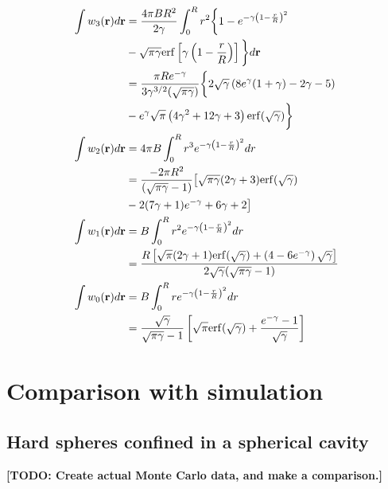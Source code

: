 \documentclass[letterpaper,twocolumn,amsmath,amssymb,prb]{revtex4-1}
\newcommand{\red}[1]{{\bf \color{red} #1}}
\newcommand{\rr}{\textbf{r}}
\newcommand{\fixme}[1]{\red{[#1]}}
\begin{document}
\begin{align}
  \int w_3(\rr)d\rr &= \frac{4\pi BR^2}{2\gamma}\int_0^R r^2 \bigg\{1-
                     e^{-\gamma \left(1-\frac{r}{R} \right)^2} \notag\\
                    &-\sqrt{\pi \gamma} \mathrm{erf}\left[ \gamma \left(1 - \frac{r}{R}
                      \right) \right] \bigg\} d\rr\\
                     &= \frac{\pi R
                       e^{-\gamma}}{3\gamma^{3/2}(\sqrt{\pi \gamma})}
                     \bigg\{2\sqrt{\gamma}
                     \left(8e^\gamma(1+\gamma)-2\gamma -5 \right) \notag\\
                     &- e^\gamma \sqrt{\pi} \left(4\gamma^2 +12\gamma
                     +3 \right) \mathrm{erf}(\sqrt{\gamma}) \bigg\}\\
  \int w_2(\rr)d\rr &= 4\pi B \int_0^R r^3 e^{-\gamma \left ( 1 - \frac{r}{R}
           \right)^2} dr \\
        &= \frac{-2\pi R^2}{(\sqrt{\pi
           \gamma} -1)}\big[ \sqrt{\pi \gamma}(2\gamma
           +3)\mathrm{erf}(\sqrt{\gamma})\notag \\
           & - 2(7\gamma + 1)e^{-\gamma} +6\gamma +2 \big] \\
  \int w_1(\rr)d\rr &= B\int_0^R r^2 e^{-\gamma \left ( 1 - \frac{r}{R}
            \right)^2} dr\\
         &= \frac{R\left[ \sqrt{\pi}(2\gamma + 1)\mathrm{erf}(\sqrt{\gamma})
          + \left(4-6e^{-\gamma}\right)\sqrt{\gamma}
          \right]}{2\sqrt{\gamma}( \sqrt{\pi \gamma} -1)} \\
  \int w_0(\rr)d\rr &= B\int_0^R r e^{-\gamma \left ( 1 - \frac{r}{R}
            \right)^2} dr\\
              &= \frac{\sqrt{\gamma}}{\sqrt{\pi \gamma} -1}\left[
              \sqrt{\pi} \mathrm{erf}(\sqrt{\gamma}) +
               \frac{e^{-\gamma}-1}{\sqrt{\gamma}} \right]
\end{align}
 
\section{Comparison with simulation}

\subsection{Hard spheres confined in a spherical cavity}

\fixme{TODO: Create actual Monte Carlo data, and make a comparison.}
\end{document}
